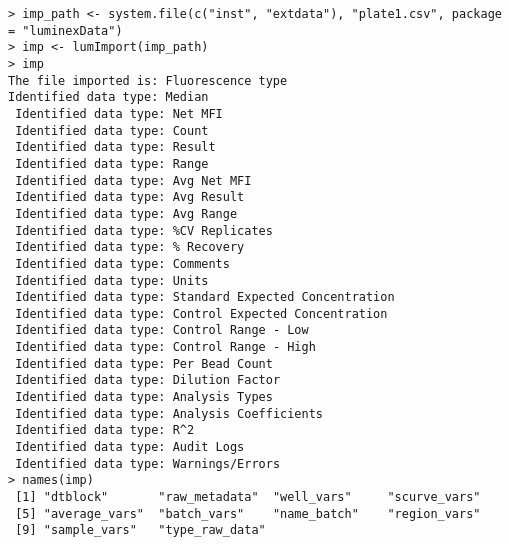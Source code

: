 \begin{knitrout}
\color{fgcolor}\begin{kframe}
\begin{verbatim}
> imp_path <- system.file(c("inst", "extdata"), "plate1.csv", package = "luminexData")
> imp <- lumImport(imp_path)
> imp
The file imported is: Fluorescence type 
Identified data type: Median 
 Identified data type: Net MFI 
 Identified data type: Count 
 Identified data type: Result 
 Identified data type: Range 
 Identified data type: Avg Net MFI 
 Identified data type: Avg Result 
 Identified data type: Avg Range 
 Identified data type: %CV Replicates 
 Identified data type: % Recovery 
 Identified data type: Comments 
 Identified data type: Units 
 Identified data type: Standard Expected Concentration 
 Identified data type: Control Expected Concentration 
 Identified data type: Control Range - Low 
 Identified data type: Control Range - High 
 Identified data type: Per Bead Count 
 Identified data type: Dilution Factor 
 Identified data type: Analysis Types 
 Identified data type: Analysis Coefficients 
 Identified data type: R^2 
 Identified data type: Audit Logs 
 Identified data type: Warnings/Errors 
> names(imp)
 [1] "dtblock"       "raw_metadata"  "well_vars"     "scurve_vars"  
 [5] "average_vars"  "batch_vars"    "name_batch"    "region_vars"  
 [9] "sample_vars"   "type_raw_data"
\end{verbatim}
\end{kframe}
\end{knitrout}